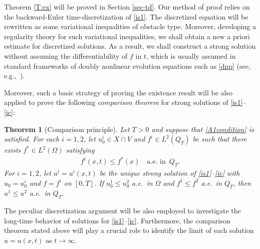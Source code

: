 \documentclass[reqno,10pt]{amsart}
\newtheorem{Th}{Theorem}[section]
\begin{document}
Theorem \ref{T:ex} will be proved in Section \ref{sec-td}. Our method of
proof relies on the backward-Euler time-discretization of \eqref{is1}.
The discretized equation will be rewritten as some variational
inequalities of obstacle type. Moreover,
developing a regularity theory for such variational inequalities, we
shall obtain a new a priori estimate for discretized solutions. As a
result, we shall construct a strong solution without assuming the
differentiability of $f$ in $t$, which is usually assumed in standard
frameworks of doubly nonlinear evolution equations such as \eqref{dnp}
(see, e.g.,~\cite{Barbu75,Arai,Senba}).

Moreover, such a basic strategy of proving the existence result will be
also applied to prove the following \emph{comparison theorem} for strong
solutions of \eqref{is1}--\eqref{ic}:

\begin{Th}[Comparison principle]\label{T:comp}
Let $T > 0$ and suppose that \eqref{A1condition} is satisfied.
For each $i = 1,2$, let $u_0^i\in X\cap V$ and $f^i\in L^2(Q_T)$ be such
 that there exists $f^*\in L^2(\Omega)$ satisfying
\begin{align*}
f^i(x,t)\le f^*(x)\quad \mbox{a.e.~in } \, Q_T.
\end{align*}
For $i=1,2$, let $u^i=u^i(x,t)$ be the unique strong solution of
 \eqref{is1}--\eqref{ic} with $u_0=u_0^i$ and $f=f^i$ on $[0,T]$. 
If $u_0^1\le u_0^2$ a.e.~in $\Omega$ and $f^1\le f^2$ a.e.~in $Q_T$, 
then $u^1\le u^2$ a.e.~in $Q_T$.
\end{Th}

The peculiar discretization argument will be also employed to
investigate the long-time behavior of solutions for
\eqref{is1}--\eqref{ic}. Furthermore, the comparison theorem stated above
will play a crucial role to identify the limit of each solution $u =
u(x,t)$ as $t \to \infty$.
\end{document}
